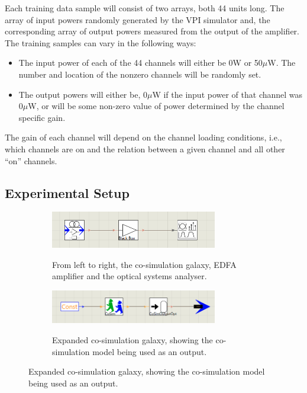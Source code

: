 Each training data sample will consist of two arrays, both 44 units long. The array of input powers randomly generated by the VPI simulator and, the corresponding array of output powers measured from the output of the amplifier. The training samples can vary in the following ways:
\begin{itemize}
    \item The input power of each of the 44 channels will either be 0W or 50$\mu$W. The number and location of the nonzero channels will be randomly set.
    
    \item The output powers will either be, 0$\mu$W if the input power of that channel was 0$\mu$W, or will be some non-zero value of power determined by the channel specific gain.
\end{itemize}

The gain of each channel will depend on the channel loading conditions, i.e., which channels are on and the relation between a given channel and all other “on” channels.




\subsection{Experimental Setup}
\FloatBarrier

\begin{figure}
    \caption{Experimental setup in VPI. Figure \ref{fig:tw:top_lvl} shows the top level simulation. Figure \ref{fig:tw:co_sim_galaxy} shows the expanded co-simulation sub-module, referred to as a galaxy.}
    \begin{subfigure}{\textwidth}
        \centering
        \caption{From left to right, the co-simulation galaxy, EDFA amplifier and the optical systems analyser.}
        \includegraphics[width=0.8\textwidth]{images/technical_work/section_2_data generation/ex_setup.png}
        \label{fig:tw:top_lvl}
    \end{subfigure}
    \begin{subfigure}{\textwidth}
        \centering
        \caption{Expanded co-simulation galaxy, showing the co-simulation model being used as an output.}
        \includegraphics[width=0.8\textwidth]{images/technical_work/section_2_data generation/co_sim_galaxy.png} 
        \label{fig:tw:co_sim_galaxy}
    \end{subfigure}
    \label{fig:tw:exp_setup}
\end{figure}


